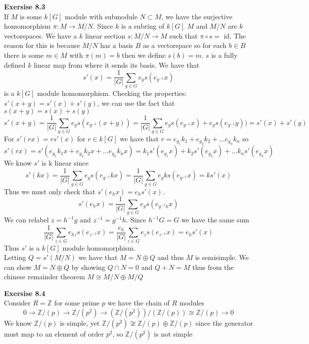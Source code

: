 \documentclass[12pt]{article}
\newenvironment{ques}[1]{\textbf{Exersise #1}\vspace{1 mm}\\ }{\bigskip}
\theoremstyle{definition}
\newcommand{\Z}{\mathbb Z}
\begin{document}
\begin{ques}{8.3}
	If $M$ is some $k[G]$ module with submodule $N \subset M$, we have the
	surjective homomorphism $\pi : M \to M/N$. Since $k$ is a subring of $k[G]$
	$M$ and $M/N$ are $k$ vectorspaces. We have a $k$ linear section $s :
	M/N \to M$ such that $\pi \circ s =$ id. The reason for this is because
	$M/N$ has a basis $B$ as a vectorspace so for each $b \in B$ there is some
	$m \in M$ with $\pi(m) = b$ then we define $s(b) = m$. $s$ is a fully
	defined $k$ linear map from where it sends its basis. We have that
	$$s'(x) = \frac{1}{|G|} \sum_{g \in G}e_gs(e_{g^{-1}}x)$$
	is a $k[G]$ module homomorphism. Checking the properties:\\
	$s'(x + y) = s'(x) + s'(y)$, we can use the fact that $s(x + y) = s(x) + s(y)$
	$$s'(x + y) = \frac{1}{|G|} \sum_{g \in G}e_gs(e_{g^{-1}}(x+y)) =
	\frac{1}{|G|} \sum_{g \in G}e_gs(e_{g^{-1}}x)+ e_gs(e_{g^{-1}}y)) = s'(x) +
	s'(y)$$
	For $s'(rx) = rs'(x)$ for $r \in k[G]$ we have that $r = e_{g_1}k_1 +
	e_{g_2}k_2 + \dots e_{g_n}k_n$ so 
	$$s'(rx) = s'(e_{g_1}k_1x + e_{g_2}k_2x + \dots e_{g_n}k_nx) =
	k_1s'(e_{g_1}x) + k_2s'(e_{g_2}x) + \dots k_ns'(e_{g_n}x)$$
	We know $s'$ is k linear since 
	$$s'(kx) = \frac{1}{|G|} \sum_{g \in G}e_gs(e_{g^{-1}}kx) = \frac{1}{|G|}
	\sum_{g \in G}e_gks(e_{g^{-1}}x) = ks'(x)$$
	Thus we must only check that $s'(e_hx) = e_hs'(x)$. \\
	$$s'(e_hx) = \frac{1}{|G|} \sum_{g \in G}e_gs(e_{g^{-1}h}x) $$
	We can relabel $z = h^{-1}g$ and $z^{-1} = g^{-1}h$. Since $h^{-1}G = G$ we
	have the same sum
	$$\frac{1}{|G|} \sum_{z \in G}e_{hz}s(e_{z^{-1}}x) = \frac{e_h}{|G|}
	\sum_{z \in G}e_{z}s(e_{z^{-1}}x) = e_hs'(x)$$
	Thus $s'$ is a $k[G]$ module homomorphism.\\
	Letting $Q = s'(M/N)$ we have that $M = N \oplus Q$ and thus $M$ is
	semisimple. We can show $M = N \oplus Q$ by showing $Q \cap N = 0$ and $Q +
	N = M$ thus from the chinese remainder theorem $M \cong M/N \oplus M/Q$

\end{ques}

\begin{ques}{8.4}
	Consider $R = \Z$ for some prime $p$ we have the chain of $R$ modules
	$$0 \to \Z/(p) \to \Z/(p^2) \to (\Z/(p^2)) / (\Z/(p)) \cong \Z/(p) \to
	0$$
	We know $\Z/(p)$ is simple, yet $\Z/(p^2) \not \cong \Z/(p) \oplus \Z/(p)$
	since the generator must map to an element of order $p^2$, so
	$\Z/(p^2)$ is not simple
\end{ques}
\end{document}
